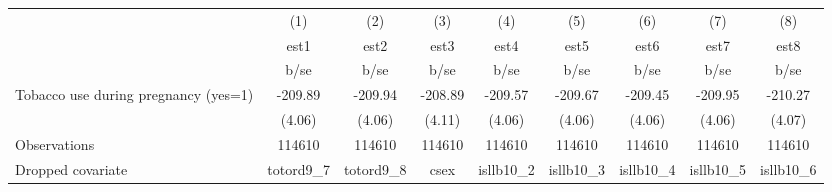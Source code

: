 {
\def\sym#1{\ifmmode^{#1}\else\(^{#1}\)\fi}
\begin{tabular}{l*{8}{c}}
\hline\hline
                                                  &\multicolumn{1}{c}{(1)}&\multicolumn{1}{c}{(2)}&\multicolumn{1}{c}{(3)}&\multicolumn{1}{c}{(4)}&\multicolumn{1}{c}{(5)}&\multicolumn{1}{c}{(6)}&\multicolumn{1}{c}{(7)}&\multicolumn{1}{c}{(8)}\\
                                                  &        est1&        est2&        est3&        est4&        est5&        est6&        est7&        est8\\
                                                  &        b/se&        b/se&        b/se&        b/se&        b/se&        b/se&        b/se&        b/se\\
\hline
Tobacco use during pregnancy (yes=1)              &     -209.89&     -209.94&     -208.89&     -209.57&     -209.67&     -209.45&     -209.95&     -210.27\\
                                                  &      (4.06)&      (4.06)&      (4.11)&      (4.06)&      (4.06)&      (4.06)&      (4.06)&      (4.07)\\
\hline
Observations                                      &      114610&      114610&      114610&      114610&      114610&      114610&      114610&      114610\\
Dropped covariate                                 &   totord9\_7&   totord9\_8&        csex&   isllb10\_2&   isllb10\_3&   isllb10\_4&   isllb10\_5&   isllb10\_6\\
\hline\hline
\end{tabular}
}

